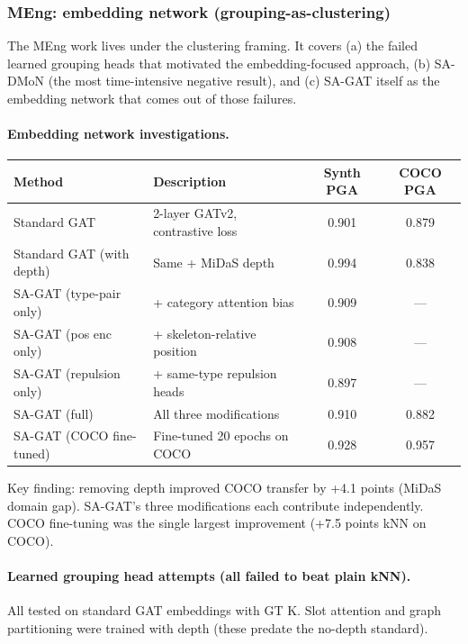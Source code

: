 \subsubsection{MEng: embedding network (grouping-as-clustering)}

The MEng work lives under the clustering framing. It covers (a) the failed learned grouping heads that motivated the embedding-focused approach, (b) SA-DMoN (the most time-intensive negative result), and (c) SA-GAT itself as the embedding network that comes out of those failures.

\paragraph{Embedding network investigations.}

\begin{tabular}{llcc}
\hline
\textbf{Method} & \textbf{Description} & \textbf{Synth PGA} & \textbf{COCO PGA} \\
\hline
Standard GAT~\cite{brody2022gatv2} & 2-layer GATv2, contrastive loss & 0.901 & 0.879 \\
Standard GAT (with depth) & Same + MiDaS depth & 0.994 & 0.838 \\
SA-GAT (type-pair only) & + category attention bias & 0.909 & --- \\
SA-GAT (pos enc only) & + skeleton-relative position & 0.908 & --- \\
SA-GAT (repulsion only) & + same-type repulsion heads & 0.897 & --- \\
SA-GAT (full) & All three modifications & 0.910 & 0.882 \\
SA-GAT (COCO fine-tuned) & Fine-tuned 20 epochs on COCO & 0.928 & 0.957 \\
\hline
\end{tabular}

\vspace{0.5em}

Key finding: removing depth improved COCO transfer by +4.1 points (MiDaS domain gap). SA-GAT's three modifications each contribute independently. COCO fine-tuning was the single largest improvement (+7.5 points kNN on COCO).

\paragraph{Learned grouping head attempts (all failed to beat plain kNN).}

All tested on standard GAT embeddings with GT K. Slot attention and graph partitioning were trained with depth (these predate the no-depth standard).

